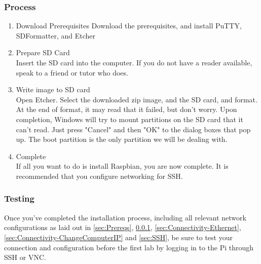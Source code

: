 \subsubsection{Process}
\label{sec:Process}
\begin{enumerate}
    \item Download Prerequisites 
        Download the prerequisites, and install PuTTY, SDFormatter, and Etcher
    \item Prepare SD Card\\
        Insert the SD card into the computer. If you do not have a reader available, speak to a friend or tutor who does.
    \item Write image to SD card\\
        Open Etcher. Select the downloaded zip image, and the SD card, and format. At the end of format, it may read that it failed,  but don't worry. Upon completion, Windows will try to mount partitions on the SD card that it can't read. Just press "Cancel" and then "OK" to the dialog boxes that pop up. The boot partition is the only partition we will be dealing with.
    \item Complete\\
        If all you want to do is install Raspbian, you are now complete. It is recommended that you configure networking for SSH.
\end{enumerate}

\subsubsection{Testing}
Once you've completed the installation process, including all relevant network configurations as laid out in \ref{sec:Prereqs}, \ref{sec:Process}, \ref{sec:Connectivity-Ethernet}, \ref{sec:Connectivity-ChangeComputerIP} and \ref{sec:SSH}, be sure to test your connection and configuration before the first lab by logging in to the Pi through SSH or VNC.